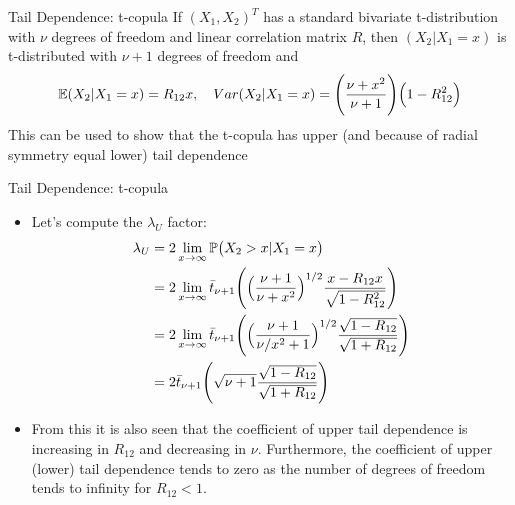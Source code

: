 \documentclass[11pt]{beamer}
\theoremstyle{plain}
\theoremstyle{definition}
\theoremstyle{remark}
\begin{document}
%
\begin{frame}{Tail Dependence: t-copula}
If $(X_1,X_2)^T$ has a standard bivariate t-distribution with $\nu$ degrees of freedom and linear correlation 
matrix $R$, then $(X_2 | X_1 = x)$ is t-distributed with $\nu + 1$ degrees of freedom and
$$
\mathbb{E} (X_2 | X_1 =x) = R_{12}x, \quad Var(X_2 | X_1 =x) = \Biggl( \frac{\nu+x^2}{\nu+1} \Biggr)\Bigl( 1 - R_{12}^2 \Bigr)
$$
This can be used to show that the t-copula has upper (and because of radial symmetry equal lower) tail dependence
\end{frame}
%
\begin{frame}{Tail Dependence: t-copula}
\footnotesize{
\begin{itemize}
	\item
			Let's compute the $\lambda_U$ factor:
			\begin{equation}
				\begin{split}
					\lambda_U &= 2 \lim\limits_{x\rightarrow\infty} \mathbb{P} \bigl( X_2 > x | X_1 = x 
					\bigr) \\
					                 &= 2 \lim\limits_{x\rightarrow\infty} \bar t_{\nu+1} \Biggl(
					                 																						  \Bigl( \frac{\nu+1}
					                 																						  {\nu+x^2} 
					                 																						  \Bigr)^{1/2} 
					                 																						  \frac{x-R_{12}
					                 																						  x}{\sqrt{1-R_{12}
					                 																						  ^2}}
					                                                                                                \Biggr) \\
					                 &= 2 \lim\limits_{x\rightarrow\infty} \bar t_{\nu+1} \Biggl(
					                 																						  \Bigl( \frac{\nu+1}
					                 																						  {\nu/x^2+1} 
					                 																						  \Bigr)^{1/2} 
					                 																						  \frac{\sqrt{1-
					                 																						  R_{12}}}
					                 																						  {\sqrt{1+R_{12}}}
					                                                                                                \Biggr) \\
					                 &= 2 \bar t_{\nu+1} \Biggl(
					                 										\sqrt{\nu+1} \frac{\sqrt{1-R_{12}}}
					                 										{\sqrt{1+R_{12}}}
					                                                     \Biggr) \\
				\end{split}
			\end{equation}
	\item
			From this it is also seen that the coefficient of upper tail dependence is increasing in $R_{12}
			$ and decreasing in $\nu$. Furthermore, the coefficient of upper (lower) tail dependence 
			tends to zero as the number of degrees of freedom tends to infinity for $R_{12} < 1$. %
\end{itemize}
}
\end{frame}
\end{document}

